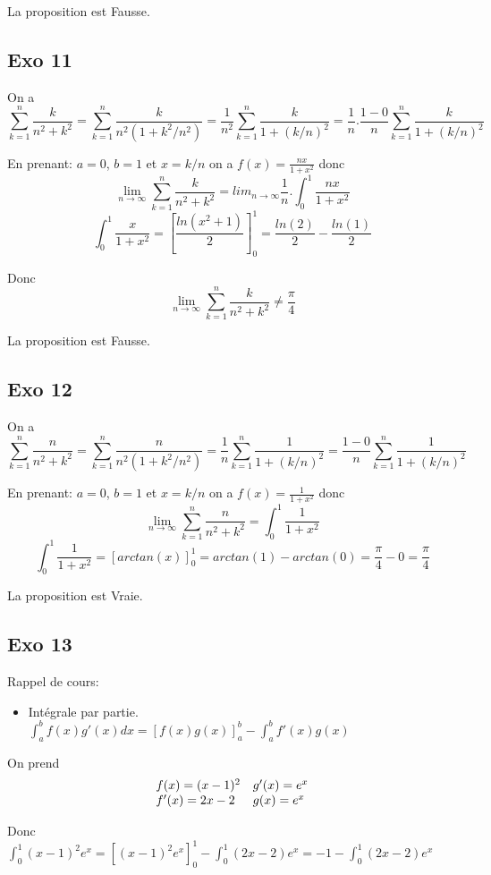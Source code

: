 \documentclass[]{book}
\theoremstyle{definition}
\begin{document}
La proposition est Fausse.

\subsection*{Exo 11}
On a $$\sum_{k=1}^{n}\frac{k}{n^2+k^2} = \sum_{k=1}^{n}\frac{k}{n^2(1+k^2/n^2)} = \frac{1}{n^2}\sum_{k=1}^{n}\frac{k}{1+(k/n)^2} = \frac{1}{n}.\frac{1-0}{n}\sum_{k=1}^{n}\frac{k}{1+(k/n)^2}$$

En prenant: $a=0$, $b=1$ et $x=k/n$ on a $f(x)=\frac{nx}{1+x^2}$ donc
$$\lim_{n \to \infty}\sum_{k=1}^{n}\frac{k}{n^2+k^2} = lim_{n \to \infty}\frac{1}{n}.\int_0^1 \frac{nx}{1+x^2}$$
$$\int_0^1 \frac{x}{1+x^2} = [\frac{ln(x^2+1)}{2}]_0^1 = \frac{ln(2)}{2} - \frac{ln(1)}{2}$$

Donc
$$ \lim_{n \to \infty}\sum_{k=1}^{n}\frac{k}{n^2+k^2} \neq \frac{\pi}{4}$$

La proposition est Fausse.

\subsection*{Exo 12}
On a $$\sum_{k=1}^{n}\frac{n}{n^2+k^2} = \sum_{k=1}^{n}\frac{n}{n^2(1+k^2/n^2)} = \frac{1}{n}\sum_{k=1}^{n}\frac{1}{1+(k/n)^2} = \frac{1-0}{n}\sum_{k=1}^{n}\frac{1}{1+(k/n)^2}$$

En prenant: $a=0$, $b=1$ et $x=k/n$ on a $f(x)=\frac{1}{1+x^2}$ donc
$$\lim_{n \to \infty}\sum_{k=1}^{n}\frac{n}{n^2+k^2} = \int_0^1 \frac{1}{1+x^2}$$
$$\int_0^1 \frac{1}{1+x^2} = [arctan(x)]_0^1 = arctan(1) - arctan(0) = \frac{\pi}{4} - 0 = \frac{\pi}{4}$$

La proposition est Vraie.

\subsection*{Exo 13}
Rappel de cours:
\begin{itemize}
\item Int\'egrale par partie. $\int_{a}^{b} f(x)g'(x)dx = [f(x)g(x)]_{a}^{b} - \int_{a}^{b}f'(x)g(x)$
\end{itemize}

On prend
$$
\begin{array}{l l}
 f(x) = (x-1)^2 & g'(x) = e^x\\
 f'(x) = 2x-2   & g(x) = e^x\\
\end{array}
$$

\medskip
Donc $\int_0^1(x-1)^2e^x = [(x-1)^2e^x]_0^1 - \int_0^1 (2x-2)e^x = -1 - \int_0^1 (2x-2)e^x$
\end{document}
